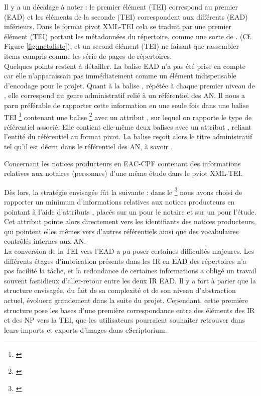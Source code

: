 Il y a un décalage à noter : le premier élément  (TEI) correspond au premier  (EAD) et les éléments  de la seconde  (TEI) correspondent aux différents  (EAD) inférieurs. Dans le format pivot XML-TEI cela se traduit par une premier élément  (TEI) portant les métadonnées du répertoire, comme une sorte de . (Cf. Figure \ref{fig:metaliste}), et un second élément  (TEI) ne faisant que rassembler items compris comme les série de pages de répertoires.\\

Quelques points restent à détailler. La balise EAD  n'a pas été prise en compte car elle n'apparaissait pas immédiatement comme un élément indispensable d'encodage pour le projet. Quant à la balise , répétée à chaque premier niveau de , elle correspond au genre administratif relié à un référentiel des AN. Il nous a paru préférable de rapporter cette information en une seule fois dans une balise TEI \footnote{\cite{tei_tei_nodate-19}} contenant une balise \footnote{\cite{tei_tei_nodate-18}} avec un attribut , sur lequel on rapporte le type de référentiel associé. Elle contient elle-même deux balises  avec un attribut , reliant l'entité du référentiel au format pivot. La balise reçoit alors le titre administratif tel qu'il est décrit dans le référentiel des AN, à savoir .

Concernant les notices producteurs en EAC-CPF contenant des informations relatives aux notaires (personnes) d'une même étude dans le pviot XML-TEI. 

Dès lors, la stratégie envisagée fût la suivante : dans le \footnote{\cite{tei_tei_nodate-17}} nous avons choisi de rapporter un minimum d'informations relatives aux notices producteurs en pointant à l'aide d'attributs , placés sur un  pour le notaire et sur un  pour l'étude. Cet attribut pointe alors directement vers les identifiants des notices producteurs, qui pointent elles mêmes vers d'autres référentiels ainsi que des vocabulaires contrôlés internes aux AN.\\

La conversion de la TEI vers l'EAD a pu poser certaines difficultés majeures. Les différents étages d'imbrication présents dans les IR en EAD des répertoires n'a pas facilité la tâche, et la redondance de certaines informations a obligé un travail souvent fastidieux d'aller-retour entre les deux IR EAD. Il y a fort à parier que la structure envisagée, du fait de sa complexité et de son niveau d'abstraction actuel, évoluera grandement dans la suite du projet. Cependant, cette première structure pose les bases d'une première correspondance entre des éléments des IR et des NP vers la TEI, que les utilisateurs pourraient souhaiter retrouver dans leurs imports et exports d'images dans eScriptorium.

